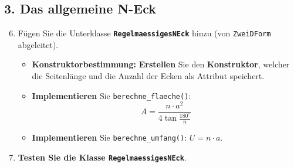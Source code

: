 \begin{myexercise}
    \subsection*{3. Das allgemeine N-Eck}

    \begin{enumerate}
        \setcounter{enumi}{5} %
        \item Fügen Sie die Unterklasse \textbf{\texttt{RegelmaessigesNEck}} hinzu (von \texttt{ZweiDForm} abgeleitet).
        \begin{itemize}
            \item \textbf{Konstruktorbestimmung:} \textbf{Erstellen} Sie den \textbf{Konstruktor}, welcher die Seitenlänge und die Anzahl der Ecken als Attribut speichert. 
            \item \textbf{Implementieren} Sie \texttt{berechne\_flaeche()}: $$A=\frac{n\cdot a^2}{4\tan{\frac{180^\circ}{n}}}$$
            \item \textbf{Implementieren} Sie \texttt{berechne\_umfang()}: $U = n \cdot a$.
        \end{itemize}

        \item \textbf{Testen Sie die Klasse \texttt{RegelmaessigesNEck}}.
    \end{enumerate}

\end{myexercise}